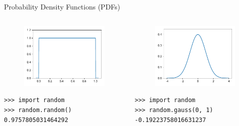 \documentclass[12pt, aspectratio=149]{beamer}
\theoremstyle{plain}
\begin{document}
\begin{frame}[fragile]{Probability Density Functions (PDFs)}
	\begin{columns}
	\begin{column}{0.5\textwidth}
		\begin{center}
		 \begin{figure}
			 \centering
			 \includegraphics[width=0.99\linewidth]{figures/uniform}
		 \end{figure}
		 \begin{verbatim}
>>> import random
>>> random.random()
0.9757805031464292
		 \end{verbatim}
		 \end{center}
	\end{column}
	\begin{column}{0.5\textwidth}  %
		\begin{center}
		 \begin{figure}
			 \centering
			 \includegraphics[width=0.99\linewidth]{figures/normal}
		 \end{figure}
		  \begin{verbatim}
>>> import random
>>> random.gauss(0, 1)
-0.19223758016631237
		  \end{verbatim}
		 \end{center}
	\end{column}
	\end{columns}
	\end{frame}
\end{document}
